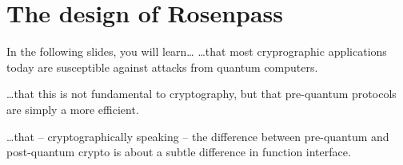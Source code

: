 \hypertarget{rosenpass}{
  \section{The design of Rosenpass}\label{rosenpass}
}

\begin{frame}{In the following slides, you will learn…}
\hypertarget{you-will-lean-post-quantum}{}
  …that most cryprographic applications today are susceptible against attacks from quantum computers.

  \vspace{2em}
  …that this is not fundamental to cryptography, but that pre-quantum protocols are simply a more efficient.

  \vspace{2em}
  …that – cryptographically speaking – the difference between pre-quantum and post-quantum crypto is about a subtle
  difference in function interface.
\end{frame}

